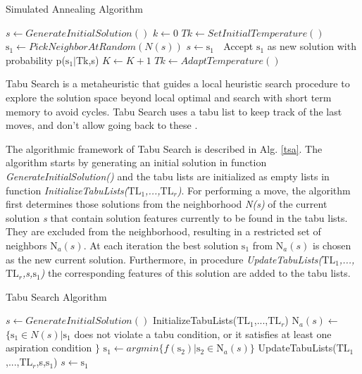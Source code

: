 \documentclass[times]{stvrauth}
\begin{document}
\begin{algorithm}[H]
  \caption{Simulated Annealing Algorithm}\label{sa}
  \begin{algorithmic}[1]
    
    \State $s\gets GenerateInitialSolution()$
    \State $k\gets 0 $
    \State $Tk\gets SetInitialTemperature()$
    \State $\mbox{s}_1\gets PickNeighborAtRandom(N (s))$
    \State $s\gets\mbox{s}_1$
    \Else $\;$ Accept $\mbox{s}_1$ as new solution with probability p($\mbox{s}_1|$Tk,s) 
    \EndIf
    \State $K\gets K+1$
    \State $Tk\gets AdaptTemperature()$
    \EndWhile
      
  \end{algorithmic}
\end{algorithm}


Tabu Search is a metaheuristic that guides a local heuristic search procedure to explore the solution space beyond local optimal and search with short term memory to avoid cycles. Tabu Search uses a  tabu list to keep track of the last  moves, and don’t allow going back to these \cite{Glover1986}.

The algorithmic framework of Tabu Search is described in Alg. \ref{tsa}.  The algorithm starts by generating an initial solution in function \textit{GenerateInitialSolution()} and the tabu lists are initialized as empty lists in function \textit{InitializeTabuLists($\mbox{TL}_1$,...,$\mbox{TL}_r$)}. For performing a move, the algorithm first determines those solutions from the neighborhood \textit{N(s)} of the current solution \textit{s} that contain solution features currently to be found in the tabu lists. They are excluded from the neighborhood, resulting in a restricted set of neighbors \textit{$\mbox{N}_a(s)$}. At each iteration the best solution \textit{$\mbox{s}_1$} from \textit{$\mbox{N}_a(s)$} is chosen as the new current solution. Furthermore, in procedure \textit{UpdateTabuLists($\mbox{TL}_1$,...,$\mbox{TL}_r$,s,$\mbox{s}_1$)} the corresponding features of this solution are added to the tabu lists.


\begin{algorithm}[H]
  \caption{Tabu Search Algorithm}\label{tsa}
  \begin{algorithmic}[2]
    
    \State $s\gets GenerateInitialSolution()$
    \State InitializeTabuLists($\mbox{TL}_1$,...,$\mbox{TL}_r$)
    \State $\mbox{N}_a(s)\gets$ $\{\mbox{s}_1 \in N(s) |\mbox{s}_1$ does not violate a tabu condition, or it satisfies at least one aspiration condition $\}$ 
    \State $\mbox{s}_1\gets argmin\{f(\mbox{s}_2)|\mbox{s}_2 \in \mbox{N}_a(s) \}$
    \State UpdateTabuLists($\mbox{TL}_1$,...,$\mbox{TL}_r$,s,$\mbox{s}_1$)
    \State $s\gets \mbox{s}_1$
    \EndWhile
      
  \end{algorithmic}
\end{algorithm}
\end{document}
